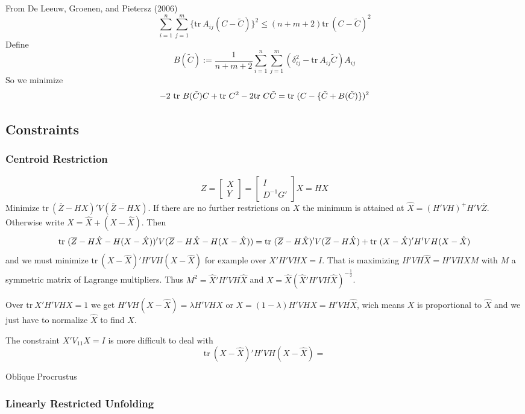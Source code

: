 \documentclass[
  12pt,
]{article}
\begin{document}
From De Leeuw, Groenen, and Pietersz (2006)
\[
\sum_{i=1}^n\sum_{j=1}^m\{\text{tr}\ A_{ij}(C-\tilde C)\}^2\leq (n+m+2)\text{tr}\ (C-\tilde C)^2
\]
Define
\[
B(\tilde C):=\frac{1}{n+m+2}\sum_{i=1}^n\sum_{j=1}^m(\delta_{ij}^2-\text{tr}\ A_{ij}\tilde C)A_{ij}
\]
So we minimize
\[
-2\ \text{tr}\ B(\tilde C)C+\text{tr}\ C^2-2\text{tr}\ C\tilde C=\\
\text{tr}\ (C-\{\tilde C + B(\tilde C)\})^2
\]

\subsection{Constraints}\label{constraints-1}

\subsubsection{Centroid Restriction}\label{centroid-restriction}

\[
Z=\begin{bmatrix}
X\\Y
\end{bmatrix}=
\begin{bmatrix}
I\\
D^{-1}G'
\end{bmatrix}X=HX
\]
Minimize \(\text{tr}\ (\overline{Z}-HX)'V(\overline{Z}-HX)\). If there are
no further restrictions on \(X\) the minimum is attained at \(\hat X=(H'VH)^+H'V\overline{Z}\).
Otherwise write \(X=\hat X+(X-\hat X)\). Then
\[
\text{tr}\ (\overline{Z}-H\hat X-H(X-\hat X))'V(\overline{Z}-H\hat X-H(X-\hat X))=\\
\text{tr}\ (\overline{Z}-H\hat X)'V(\overline{Z}-H\hat X)+
\text{tr}\ (X-\hat X)'H'VH(X-\hat X)
\]
and we must minimize \(\text{tr}\ (X-\hat X)'H'VH(X-\hat X)\) for example over \(X'H'VHX=I\).
That is maximizing \(H'VH\hat X=H'VHXM\) with \(M\) a symmetric matrix of Lagrange multipliers.
Thus \(M^2=\hat X'H'VH\hat X\) and \(X=\hat X(\hat X'H'VH\hat X)^{-\frac12}\).

Over \(\text{tr}\ X'H'VHX=1\) we get \(H'VH(X-\hat X)=\lambda H'VHX\) or
\(X=(1-\lambda)H'VHX=H'VH\hat X\), wich means \(X\) is proportional to \(\hat X\) and we just have to normalize \(\hat X\) to find \(X\).

The constraint \(X'V_{11}X=I\) is more difficult to deal with
\[
\text{tr}\ (X-\hat X)'H'VH(X-\hat X)=
\]

Oblique Procrustus

\subsubsection{Linearly Restricted Unfolding}\label{linearly-restricted-unfolding}
\end{document}
